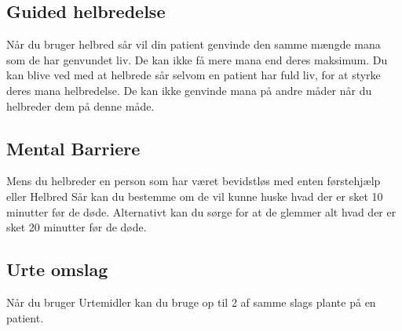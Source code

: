 \subsection{Guided helbredelse}
Når du bruger helbred sår vil din patient genvinde den samme mængde mana som de har genvundet liv. De kan ikke få mere mana end deres maksimum. Du kan blive ved med at helbrede sår selvom en patient har fuld liv, for at styrke deres mana helbredelse. De kan ikke genvinde mana på andre måder når du helbreder dem på denne måde.

\subsection{Mental Barriere}
Mens du helbreder en person som har været bevidstløs med enten førstehjælp eller Helbred Sår kan du bestemme om de vil kunne huske hvad der er sket 10 minutter før de døde. Alternativt kan du sørge for at de glemmer alt hvad der er sket 20 minutter før de døde.

\subsection{Urte omslag}
Når du bruger Urtemidler kan du bruge op til 2 af samme slags plante på en patient.
